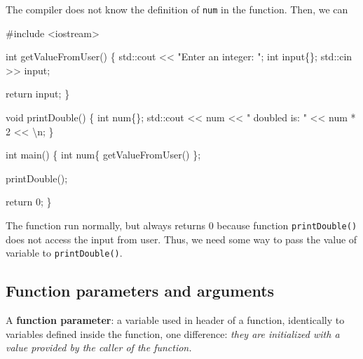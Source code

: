 \documentclass[
  letterpaper,
  DIV=11,
  numbers=noendperiod]{scrreprt}
\newenvironment{Shaded}{\begin{snugshade}}{\end{snugshade}}
\newcommand{\CommentTok}[1]{\textcolor[rgb]{0.37,0.37,0.37}{#1}}
\newcommand{\DecValTok}[1]{\textcolor[rgb]{0.68,0.00,0.00}{#1}}
\newcommand{\ErrorTok}[1]{\textcolor[rgb]{0.68,0.00,0.00}{#1}}
\newcommand{\FunctionTok}[1]{\textcolor[rgb]{0.28,0.35,0.67}{#1}}
\newcommand{\NormalTok}[1]{\textcolor[rgb]{0.00,0.23,0.31}{#1}}
\newcommand{\SpecialCharTok}[1]{\textcolor[rgb]{0.37,0.37,0.37}{#1}}
\newcommand{\StringTok}[1]{\textcolor[rgb]{0.13,0.47,0.30}{#1}}
\begin{document}
The compiler does not know the definition of \texttt{num} in the
function. Then, we can

\begin{Shaded}
\begin{Highlighting}[]
\CommentTok{\#include \textless{}iostream\textgreater{}}

\NormalTok{int }\FunctionTok{getValueFromUser}\NormalTok{()}
\NormalTok{\{}
\NormalTok{    std}\SpecialCharTok{::}\NormalTok{cout }\SpecialCharTok{\textless{}}\ErrorTok{\textless{}} \StringTok{"Enter an integer: "}\NormalTok{;}
\NormalTok{    int input\{\};}
\NormalTok{    std}\SpecialCharTok{::}\NormalTok{cin }\SpecialCharTok{\textgreater{}}\ErrorTok{\textgreater{}}\NormalTok{ input;}

\NormalTok{    return input;}
\NormalTok{\}}

\NormalTok{void }\FunctionTok{printDouble}\NormalTok{()}
\NormalTok{\{}
\NormalTok{    int num\{\};}
\NormalTok{    std}\SpecialCharTok{::}\NormalTok{cout }\SpecialCharTok{\textless{}}\ErrorTok{\textless{}}\NormalTok{ num }\SpecialCharTok{\textless{}}\ErrorTok{\textless{}} \StringTok{" doubled is: "} \SpecialCharTok{\textless{}}\ErrorTok{\textless{}}\NormalTok{ num }\SpecialCharTok{*} \DecValTok{2} \SpecialCharTok{\textless{}}\ErrorTok{\textless{}} \StringTok{\textquotesingle{}}\SpecialCharTok{\textbackslash{}n}\StringTok{\textquotesingle{}}\NormalTok{;}
\NormalTok{\}}

\NormalTok{int }\FunctionTok{main}\NormalTok{()}
\NormalTok{\{}
\NormalTok{    int num\{ }\FunctionTok{getValueFromUser}\NormalTok{() \};}

    \FunctionTok{printDouble}\NormalTok{();}

\NormalTok{    return }\DecValTok{0}\NormalTok{;}
\NormalTok{\}}
\end{Highlighting}
\end{Shaded}

The function run normally, but always returns 0 because function
\texttt{printDouble()} does not access the input from user. Thus, we
need some way to pass the value of variable to \texttt{printDouble()}.

\hypertarget{function-parameters-and-arguments}{%
\subsection{Function parameters and
arguments}\label{function-parameters-and-arguments}}

A \textbf{function parameter}: a variable used in header of a function,
identically to variables defined inside the function, one difference:
\emph{they are initialized with a value provided by the caller of the
function.}
\end{document}
